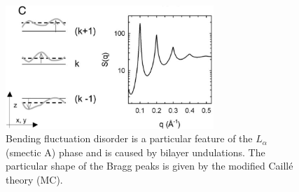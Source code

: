 \begin{figure}[htb]
\begin{center}
\includegraphics[width=0.7\textwidth]{ModifiedCailleTheorySQ.png}
\end{center}
\caption{Bending fluctuation disorder is a particular feature of
the $L_\alpha$ (smectic A) phase and is caused by bilayer
undulations. The particular shape of the Bragg peaks is given by
the modified Caill\'e theory (MC).}
\label{ModifiedCailleTheorySQ}
\end{figure}

